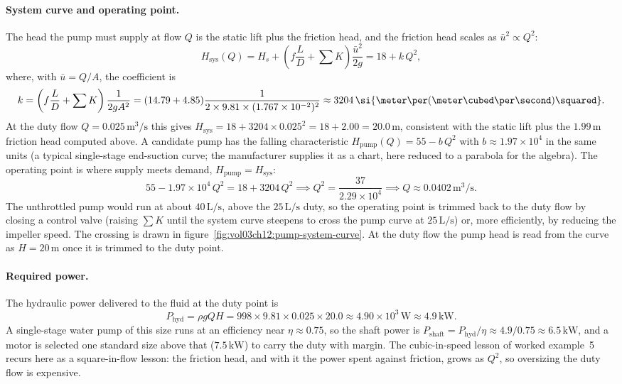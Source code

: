 \paragraph{System curve and operating point.} The head the pump must
supply at flow $Q$ is the static lift plus the friction head, and the
friction head scales as $\bar u^2 \propto Q^2$:
\[
H_{\text{sys}}(Q) = H_s + \left(f\frac{L}{D} + \sum K\right)
\frac{\bar u^2}{2g} = 18 + k\,Q^2,
\]
where, with $\bar u = Q/A$, the coefficient is
\[
k = \left(f\frac{L}{D} + \sum K\right)\frac{1}{2gA^2} = (14.79 +
4.85)\frac{1}{2\times9.81\times(1.767\times10^{-2})^2} \approx 3204\,
\si{\meter\per(\meter\cubed\per\second)\squared}.
\]
At the duty flow $Q = 0.025\,\si{\meter\cubed\per\second}$ this gives
$H_{\text{sys}} = 18 + 3204\times0.025^2 = 18 + 2.00 = 20.0\,\si{
\meter}$, consistent with the static lift plus the $1.99\,\si{\meter}$
friction head computed above. A candidate pump has the falling
characteristic $H_{\text{pump}}(Q) = 55 - b\,Q^2$ with $b \approx
1.97\times10^4$ in the same units (a typical single-stage end-suction
curve; the manufacturer supplies it as a chart, here reduced to a
parabola for the algebra). The operating point is where supply meets
demand, $H_{\text{pump}} = H_{\text{sys}}$:
\[
55 - 1.97\times10^4\,Q^2 = 18 + 3204\,Q^2 \implies Q^2 = \frac{37}{
2.29\times10^4} \implies Q \approx 0.0402\,\si{\meter\cubed\per
\second}.
\]
The unthrottled pump would run at about $40\,\si{\liter\per\second}$,
above the $25\,\si{\liter\per\second}$ duty, so the operating point is
trimmed back to the duty flow by closing a control valve (raising
$\sum K$ until the system curve steepens to cross the pump curve at
$25\,\si{\liter\per\second}$) or, more efficiently, by reducing the
impeller speed. The crossing is drawn in
figure~\ref{fig:vol03ch12:pump-system-curve}. At the duty flow the
pump head is read from the curve as $H = 20\,\si{\meter}$ once it is
trimmed to the duty point.





\paragraph{Required power.} The hydraulic power delivered to the fluid
at the duty point is
\[
P_{\text{hyd}} = \rho g Q H = 998\times9.81\times0.025\times20.0
\approx 4.90\times10^{3}\,\si{\watt} \approx 4.9\,\si{\kilo\watt}.
\]
A single-stage water pump of this size runs at an efficiency near
$\eta\approx0.75$, so the shaft power is $P_{\text{shaft}} =
P_{\text{hyd}}/\eta \approx 4.9/0.75 \approx 6.5\,\si{\kilo\watt}$,
and a motor is selected one standard size above that ($7.5\,\si{\kilo
\watt}$) to carry the duty with margin. The cubic-in-speed lesson of
worked example~5 recurs here as a square-in-flow lesson: the friction
head, and with it the power spent against friction, grows as $Q^2$, so
oversizing the duty flow is expensive.

